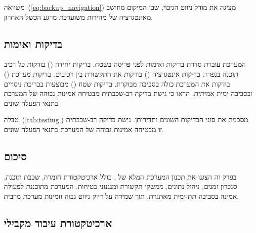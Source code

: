 משוואה~(\ref{eq:backup_navigation}) מציגה את מודל ניווט הגיבוי, שבו המיקום מחושב מאינטגרציה של מהירות משוערכת מרגע הכשל האחרון.

\subsection{בדיקות ואימות}
\label{sec:testing_validation}

המערכת עוברת סדרת בדיקות ואימות לפני פריסה בשטח. בדיקות יחידה () בודקות כל רכיב תוכנה בנפרד. בדיקות אינטגרציה () בודקות את התקשורת בין רכיבים. בדיקות מערכת () בודקות את המערכת כולה בסביבה מבוקרת. בדיקות שטח () מבוצעות בבריכת ניסויים ובסביבה ימית אמיתית. \citet{Thrun2005ProbRobotics} הראו כי גישת בדיקה רב-שכבתית מבטיחה אמינות גבוהה של המערכת בתנאי הפעלה שונים.

\begin{table}[htbp]
    \centering
    \caption{רשימת בדיקות ואימות למערכת. (Testing and validation checklist for the system.)}
    \label{tab:testing}
\end{table}

טבלה~(\ref{tab:testing}) מסכמת את סוגי הבדיקות השונים ותדירותן. גישת בדיקה רב-שכבתית זו מבטיחה אמינות גבוהה של המערכת בתנאי הפעלה שונים.

\subsection{סיכום}
\label{sec:system_summary}

בפרק זה הצגנו את תכנון המערכת המלא של , כולל ארכיטקטורת חומרה, שכבת תוכנה, סנכרון זמנים, ניהול נתונים, ממשקי תקשורת ומנגנוני בטיחות. המערכת מתוכננת לפעולה אמינה בסביבה תת-ימית מאתגרת, תוך שמירה על דיוק ניווט גבוה וזמינות מערכת מרבית.

\subsection{ארכיטקטורת עיבוד מקבילי}
\label{sec:parallel_processing}

